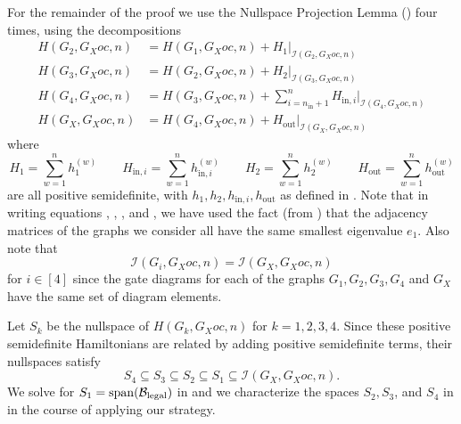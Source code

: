 \documentclass[../thesis-main/thesis-main]{subfiles}
\begin{document}
For the remainder of the proof we use the Nullspace Projection Lemma () four times, using the decompositions 
\begin{align}
H(G_{2},G_Xoc,n) & =H(G_{1},G_Xoc,n)+H_{1}\big|_{\mathcal{I}(G_{2},G_Xoc,n)}\label{eq:H_G2}\\
H(G_{3},G_Xoc,n) & =H(G_{2},G_Xoc,n)+H_{2}\big|_{\mathcal{I}(G_{3},G_Xoc,n)}\label{eq:H_G3}\\
H(G_{4},G_Xoc,n) & =H(G_{3},G_Xoc,n)+\sum_{i=n_{\text{in}}+1}^{n}H_{\text{in},i}\big|_{\mathcal{I}(G_{4},G_Xoc,n)}\label{eq:H_G4}\\
H(G_X,G_Xoc,n) & =H(G_{4},G_Xoc,n)+H_{\text{out}}\big|_{\mathcal{I}(G_X,G_Xoc,n)}\label{eq:H_GC}
\end{align}
where 
\begin{equation*}
H_{1}=\sum_{w=1}^{n}h_{1}^{(w)} \qquad H_{\text{in},i}=\sum_{w=1}^{n}h_{\text{in},i}^{(w)} \qquad 
H_{2}=\sum_{w=1}^{n}h_{2}^{(w)} \qquad  H_{\text{out}}=\sum_{w=1}^{n}h_{\text{out}}^{(w)}
\end{equation*}
are all positive semidefinite, with $h_{1},h_{2},h_{\text{in},i},h_{\text{out}}$ as defined in . Note that in writing equations , , , and , we have used the fact (from ) that the adjacency matrices of the graphs we consider all have the same smallest eigenvalue $e_{1}$. Also note that
\[ \mathcal{\mathcal{I}}\left(G_{i},G_Xoc,n\right)=\mathcal{\mathcal{I}}\left(G_X,G_Xoc,n\right) \] for $i\in[4]$ since the gate diagrams for each of the graphs $G_{1},G_{2},G_{3},G_{4}$ and $G_X$ have the same set of diagram elements.

Let $S_{k}$ be the nullspace of $H(G_{k},G_Xoc,n)$ for $k=1,2,3,4$. Since these positive semidefinite Hamiltonians are related by adding positive semidefinite terms, their nullspaces satisfy 
\[
S_{4}\subseteq S_{3}\subseteq S_{2}\subseteq S_{1}\subseteq\mathcal{\mathcal{I}}\left(G_X,G_Xoc,n\right).
\]
We solve for $S_1=\operatorname{span}(\mathcal{B}_{\text{legal}})$ in  and we characterize the spaces $S_2,S_3$, and $S_4$ in  in the course of applying our strategy. 
\end{document}
